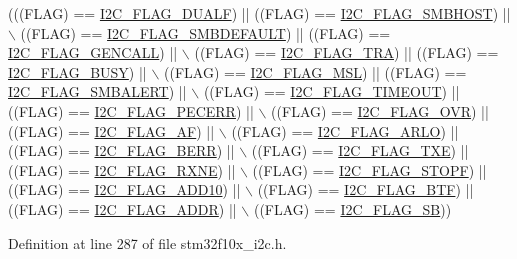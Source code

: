 \begin{DoxyCode}
(((FLAG) == \hyperlink{group___i2_c__flags__definition_ga3755b783aa73568659478c2e2e45e27f}{I2C\_FLAG\_DUALF}) || ((FLAG) == \hyperlink{group___i2_c__flags__definition_gaf15403a1852f39aaadbb8942ba98d97e}{I2C\_FLAG\_SMBHOST}) || \(\backslash\)
                               ((FLAG) == \hyperlink{group___i2_c__flags__definition_ga371fb29861d1cd41736253e804c67ad5}{I2C\_FLAG\_SMBDEFAULT}) || ((FLAG) == 
      \hyperlink{group___i2_c__flags__definition_gab3a93b6840ad406c2fc09e0e96c59b88}{I2C\_FLAG\_GENCALL}) || \(\backslash\)
                               ((FLAG) == \hyperlink{group___i2_c__flags__definition_ga0359a5f960670d51cb17e659d32498ea}{I2C\_FLAG\_TRA}) || ((FLAG) == 
      \hyperlink{group___i2_c__flags__definition_ga50f69f043d99600221076100823b6ff3}{I2C\_FLAG\_BUSY}) || \(\backslash\)
                               ((FLAG) == \hyperlink{group___i2_c__flags__definition_gae8e6a404cbfd70420d278d520304f368}{I2C\_FLAG\_MSL}) || ((FLAG) == 
      \hyperlink{group___i2_c__flags__definition_ga4e1d7cd1574d03ba501c27483300c1be}{I2C\_FLAG\_SMBALERT}) || \(\backslash\)
                               ((FLAG) == \hyperlink{group___i2_c__flags__definition_ga89c8d5d8ccc77a8619fafe9b39d1cc74}{I2C\_FLAG\_TIMEOUT}) || ((FLAG) == 
      \hyperlink{group___i2_c__flags__definition_ga6c7addb6413f165f42bcc87506ea8467}{I2C\_FLAG\_PECERR}) || \(\backslash\)
                               ((FLAG) == \hyperlink{group___i2_c__flags__definition_gab579673c8ac920db199aa7f18e547fb3}{I2C\_FLAG\_OVR}) || ((FLAG) == 
      \hyperlink{group___i2_c__flags__definition_ga2f89dbba9b964e6ade1480705e7a97d4}{I2C\_FLAG\_AF}) || \(\backslash\)
                               ((FLAG) == \hyperlink{group___i2_c__flags__definition_gae1e67936f4780e42b8bbe04ac9c20a7b}{I2C\_FLAG\_ARLO}) || ((FLAG) == 
      \hyperlink{group___i2_c__flags__definition_ga0454176b6ddd5c402abc3ef5953a21ad}{I2C\_FLAG\_BERR}) || \(\backslash\)
                               ((FLAG) == \hyperlink{group___i2_c__flags__definition_gaeda14a3e9d02ff20a0d001bba9328f3d}{I2C\_FLAG\_TXE}) || ((FLAG) == 
      \hyperlink{group___i2_c__flags__definition_gad53c5b70a186f699f187c7a641ab0dac}{I2C\_FLAG\_RXNE}) || \(\backslash\)
                               ((FLAG) == \hyperlink{group___i2_c__flags__definition_gacc7d993963e199a6ddba391dab8da896}{I2C\_FLAG\_STOPF}) || ((FLAG) == 
      \hyperlink{group___i2_c__flags__definition_ga316c78cbf34b74da96d69f702a0d1444}{I2C\_FLAG\_ADD10}) || \(\backslash\)
                               ((FLAG) == \hyperlink{group___i2_c__flags__definition_ga4dc3d44342007a5cd21c3baa0d938606}{I2C\_FLAG\_BTF}) || ((FLAG) == 
      \hyperlink{group___i2_c__flags__definition_ga5472d1196e934e0cc471aba8f66af416}{I2C\_FLAG\_ADDR}) || \(\backslash\)
                               ((FLAG) == \hyperlink{group___i2_c__flags__definition_gae009ab84be03fcc438625b1c39376ad4}{I2C\_FLAG\_SB}))
\end{DoxyCode}


Definition at line 287 of file stm32f10x\+\_\+i2c.\+h.

